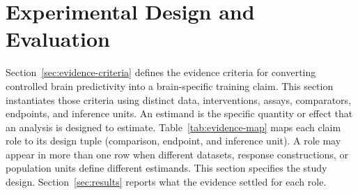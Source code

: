 \section{Experimental Design and Evaluation}
\label{sec:framework}

Section~\ref{sec:evidence-criteria} defines the evidence criteria for converting controlled brain predictivity into a brain-specific training claim.
This section instantiates those criteria using distinct data, interventions, assays, comparators, endpoints, and inference units.
An estimand is the specific quantity or effect that an analysis is designed to estimate.
Table~\ref{tab:evidence-map} maps each claim role to its design tuple (comparison, endpoint, and inference unit).
A role may appear in more than one row when different datasets, response constructions, or population units define different estimands.
This section specifies the study design.
Section~\ref{sec:results} reports what the evidence settled for each role.

